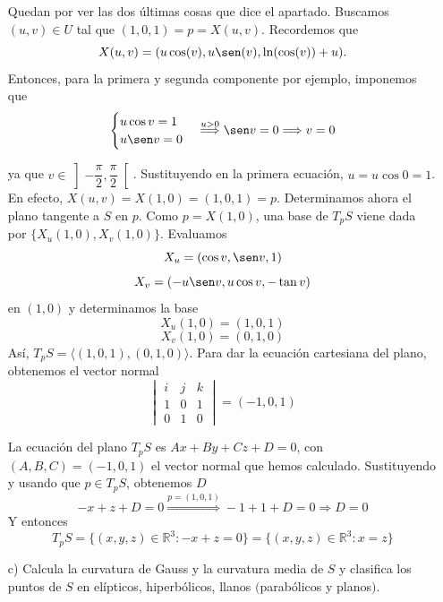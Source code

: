 \documentclass[12pt]{article}
\newcommand{\R}{\mathbb{R}}
\begin{document}
\begin{ejercicio}
\begin{enumerate}
            Quedan por ver las dos últimas cosas que dice el apartado. Buscamos $(u,v) \in U$ tal que $(1,0,1) = p = X(u,v)$. 
            Recordemos que $$X(u,v)=(u\cos(v),u\sen(v),\ln(\cos(v))+u).$$ Entonces, para la primera y segunda componente por ejemplo,
            imponemos que 
            $$\begin{cases}
                u \cos v = 1 \\
                u \sen v = 0
            \end{cases} \stackrel{u>0}{\Longrightarrow} \sen v = 0 \Longrightarrow v = 0$$

            ya que $v \in \left] - \dfrac{\pi}{2}, \dfrac{\pi}{2} \right[$. Sustituyendo en la primera ecuación, $u = u \cos 0 = 1$. \\

            En efecto, $X(u,v) = X(1,0) = (1, 0, 1) = p$. Determinamos ahora el plano tangente a $S$ en $p$. Como $p = X(1,0)$, 
            una base de $T_pS$ viene dada por $\{X_u(1,0), X_v(1,0)\}$. Evaluamos
            $$X_u = (\cos v, \sen v, 1)$$
            $$X_v = (-u \sen v, u \cos v, -\tan v)$$
            en $(1,0)$ y determinamos la base
            $$X_u(1,0) = (1,0,1)$$
            $$X_v(1,0) = (0,1,0)$$
            Así, $T_pS = \langle (1,0,1), (0,1,0) \rangle$. Para dar la ecuación cartesiana del plano, obtenemos el vector normal
            $$\begin{vmatrix}
                i & j & k \\
                1 & 0 & 1 \\
                0 & 1 & 0
            \end{vmatrix} = (-1,0,1)$$

            La ecuación del plano $T_pS$ es $Ax + By + Cz + D = 0$, con $(A,B,C) = (-1,0,1)$ el vector normal que hemos calculado. Sustituyendo
            y usando que $p \in T_p S$, obtenemos $D$
            $$-x + z + D = 0 \stackrel{p = (1,0,1)}{\Longrightarrow} -1 + 1 + D = 0 \Longrightarrow D = 0$$
            Y entonces
            $$\boxed{T_p S = \{(x,y,z) \in \R^3 : -x + z = 0 \} = \{(x,y,z) \in \R^3 : x = z \}}$$

            \item[c)] Calcula la curvatura de Gauss y la curvatura media de $S$ y clasifica los puntos de $S$ en elípticos, hiperbólicos, 
            llanos $($parabólicos y planos$)$. \\


\end{enumerate}
\end{ejercicio}
\end{document}
